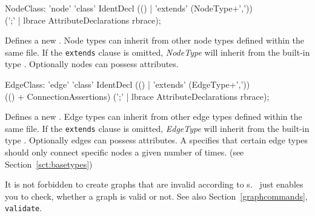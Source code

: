 \begin{rail}
  NodeClass: 'node' 'class' IdentDecl (() | 'extends' (NodeType+',')) \\
    (';' | lbrace AttributeDeclarations rbrace);
\end{rail}
Defines a new . Node types can inherit from other node types defined within the same file. If the \texttt{extends} clause is omitted, \emph{NodeType} will inherit from the built-in type \texttt{}. Optionally nodes can possess attributes.

\begin{rail}
  EdgeClass: 'edge' 'class' IdentDecl (() | 'extends' (EdgeType+',')) \\
    (() + ConnectionAssertions) (';' | lbrace AttributeDeclarations rbrace);
\end{rail}
Defines a new .
Edge types can inherit from other edge types defined within the same file.
If the \texttt{extends} clause is omitted, \emph{EdgeType} will inherit from the built-in type \texttt{}.
Optionally edges can possess attributes.
A  specifies that certain edge types should only connect specific nodes a given number of times.
(see Section~\ref{sct:basetypes})

\begin{note}
It is not forbidden to create graphs that are invalid according to s.
\GrG\ just enables you to check, whether a graph is valid or not.
See also Section~\ref{graphcommands}, \texttt{validate}.
\end{note}


